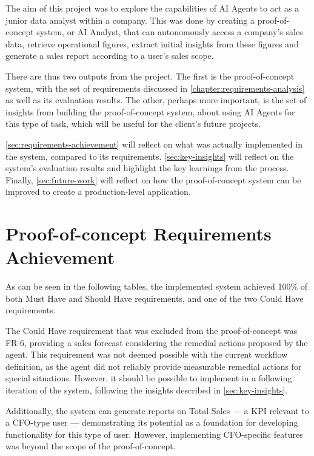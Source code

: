 \documentclass[a4paper]{report}
\begin{document}
The aim of this project was to explore the capabilities of AI Agents to act as a junior data analyst within a company. This was done by creating a proof-of-concept system, or AI Analyst, that can autonomously access a company's sales data, retrieve operational figures, extract initial insights from these figures and generate a sales report according to a user's sales scope.

There are thus two outputs from the project. The first is the proof-of-concept system, with the set of requirements discussed in \autoref{chapter:requirements-analysis} as well as its evaluation results. The other, perhaps more important, is the set of insights from building the proof-of-concept system, about using AI Agents for this type of task, which will be useful for the client's future projects.

\autoref{sec:requirements-achievement} will reflect on what was actually implemented in the system, compared to its requirements. \autoref{sec:key-insights} will reflect on the system's evaluation results and highlight the key learnings from the process. Finally, \autoref{sec:future-work} will reflect on how the proof-of-concept system can be improved to create a production-level application.

\section{Proof-of-concept Requirements Achievement}
\label{sec:requirements-achievement}

As can be seen in the following tables, the implemented system achieved 100\% of both Must Have and Should Have requirements, and one of the two Could Have requirements.

The Could Have requirement that was excluded from the proof-of-concept was FR-6, providing a sales forecast considering the remedial actions proposed by the agent. This requirement was not deemed possible with the current workflow definition, as the agent did not reliably provide measurable remedial actions for special situations. However, it should be possible to implement in a following iteration of the system, following the insights described in \autoref{sec:key-insights}.

Additionally, the system can generate reports on Total Sales --- a KPI relevant to a CFO-type user --- demonstrating its potential as a foundation for developing functionality for this type of user. However, implementing CFO-specific features was beyond the scope of the proof-of-concept.
\end{document}
